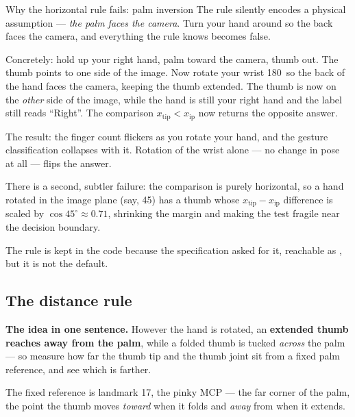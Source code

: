 \begin{edgetrap}{Why the horizontal rule fails: palm inversion}
The rule silently encodes a physical assumption --- \emph{the palm faces the camera}. Turn your hand
around so the back faces the camera, and everything the rule knows becomes false.

Concretely: hold up your right hand, palm toward the camera, thumb out. The thumb points to one side
of the image. Now rotate your wrist 180\textdegree\ so the back of the hand faces the camera, keeping
the thumb extended. The thumb is now on the \emph{other} side of the image, while the hand is still
your right hand and the label still reads ``Right''. The comparison $x_{\text{tip}} < x_{\text{ip}}$
now returns the opposite answer.

The result: the finger count flickers as you rotate your hand, and the gesture classification
collapses with it. Rotation of the wrist alone --- no change in pose at all --- flips the answer.

There is a second, subtler failure: the comparison is purely horizontal, so a hand rotated in the
image plane (say, 45\textdegree) has a thumb whose $x_{\text{tip}} - x_{\text{ip}}$ difference is
scaled by $\cos 45^\circ \approx 0.71$, shrinking the margin and making the test fragile near the
decision boundary.
\end{edgetrap}

The rule is kept in the code because the specification asked for it, reachable as
, but it is not the default.

\subsection{The distance rule}

\begin{keyidea}
\textbf{The idea in one sentence.}
However the hand is rotated, an \textbf{extended thumb reaches away from the palm}, while a folded
thumb is tucked \emph{across} the palm --- so measure how far the thumb tip and the thumb joint sit
from a fixed palm reference, and see which is farther.
\end{keyidea}

The fixed reference is landmark 17, the pinky MCP --- the far corner of the palm, the point the thumb
moves \emph{toward} when it folds and \emph{away} from when it extends.

